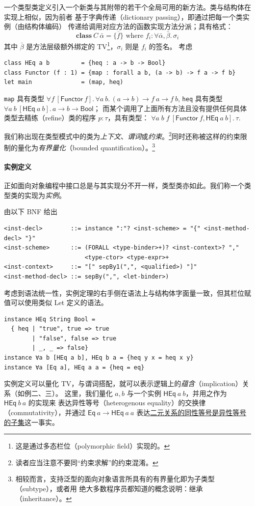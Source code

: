 一个类型类定义引入一个新类与其附带的若干个全局可用的新方法。类与结构体在实现上相似，因为前者
基于字典传递（dictionary passing），即通过把每一个类实例（由结构体编码）
传递给调用对应方法的函数实现方法分派；具有格式：
\begin{equation}
  \mathbf{class}\ C\ \bar{\alpha} = \{\overline{f}\}\text{ where }   f_i : \forall \bar{\alpha}, \bar{\beta}.\, \sigma_i
\end{equation}
其中 \(\bar{\beta}\) 是方法层级额外绑定的 TV\footnote{这是通过多态栏位（polymorphic field）实现的。}，$\sigma_i$ 则是 $f_i$ 的签名。
考虑
\begin{verbatim}
class HEq a b         = {heq : a -> b -> Bool}
class Functor (f : 1) = {map : forall a b, (a -> b) -> f a -> f b}
let main              = (map, heq)
\end{verbatim}
\texttt{map} 具有类型
\(\forall f\ [\mathsf{Functor}\ f].\, \forall a\ b.\, (a\to b)\to f\ a\to f\ b\), \texttt{heq} 具有类型
\(\forall a\ b\ [\mathsf{HEq}\ a\ b].\, a\to b\to \mathsf{Bool}\)；
而某个调用了上面所有方法且没有提供任何具体类型去精练（refine）类的程序 $p : \tau$，具有类型：
$
\forall a\;b\;f\ [\mathsf{Functor}\ f, \mathsf{HEq}\ a\ b].\,\tau
$.

我们称出现在类型模式中的类为\emph{上下文}、\emph{谓词}或\emph{约束}。\footnote{
  读者应当注意不要同“约束求解”的约束混淆。
}同时还称被这样的约束限制的量化为\emph{有界量化}（bounded quantification）。\footnote{
  相较而言，支持泛型的面向对象语言所具有的有界量化即为子类型（subtype），或者用
  绝大多数程序员都知道的概念说明：继承（inheritance）。
}

\paragraph{实例定义}
正如面向对象编程中接口总是与其实现分不开一样，类型类亦如此。我们称一个类型类的实现为\emph{实例}。
\begin{definition}[类型类的实例声明] 由以下 BNF 给出
\begin{verbatim}
<inst-decl>        ::= instance ":"? <inst-scheme> = "{" <inst-method-decl> "}"
<inst-scheme>      ::= (FORALL <type-binder>+)? <inst-context>? ","
                       <type-ctor> <type-expr>+
<inst-context>     ::= "[" sepBy1(",", <qualified>) "]"
<inst-method-decl> ::= sepBy(",", <let-binder>)
\end{verbatim}
  考虑到语法统一性，实例定理的右手侧在语法上与结构体字面量一致，但其栏位赋值可以使用类似
  Let 定义的语法。
\end{definition}
\begin{verbatim}
instance HEq String Bool =
  { heq | "true", true => true
        | "false", false => true
        | _, _ => false}
instance ∀a b [HEq a b], HEq b a = {heq y x = heq x y}
instance ∀a [Eq a], HEq a a = {heq = eq}
\end{verbatim}
实例定义可以量化 TV，与谓词搭配，就可以表示逻辑上的\emph{蕴含}（implication）关系（如例二、三）。
这里，我们量化 $a, b$ 与一个实例 \(\mathsf{HEq}\ a\ b\)，并用之作为 $\mathsf{HEq}\ b\ a$ 的实现来
表达异性等号（heterogenous equality）的交换律（commutativity），并通过 $\mathsf{Eq}\ a\to \mathsf{HEq}\ a\ a$ 表达\underline{二元关系的同性等号是异性等号的子集}这一事实。

